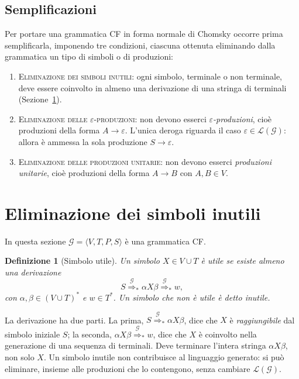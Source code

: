 \documentclass[a4paper, 11pt, oneside]{book}
\theoremstyle{formale}
\newtheorem*{definition}{Definizione}
\begin{document}
    \subsection{Semplificazioni}
    \label{sec:semplificazioni}
    Per portare una grammatica CF in forma normale di Chomsky occorre prima semplificarla,
    imponendo tre condizioni, ciascuna ottenuta eliminando dalla grammatica un tipo di
    simboli o di produzioni:
    \begin{enumerate}
        \item \textsc{Eliminazione dei simboli inutili}: ogni simbolo, terminale o non
            terminale, deve essere coinvolto in almeno una derivazione di una stringa di
            terminali (Sezione~\ref{sec:simboli-inutili}).
        \item \textsc{Eliminazione delle $\varepsilon$-produzioni}: non devono esserci
            \emph{$\varepsilon$-produzioni}, cio\`e produzioni della forma
            $A \to \varepsilon$. L'unica deroga riguarda il caso
            $\varepsilon \in \mathcal{L}(\mathcal{G})$: allora \`e ammessa la sola
            produzione $S \to \varepsilon$.
        \item \textsc{Eliminazione delle produzioni unitarie}: non devono esserci
            \emph{produzioni unitarie}, cio\`e produzioni della forma $A \to B$ con
            $A, B \in V$.
    \end{enumerate}

    \section{Eliminazione dei simboli inutili}
    \label{sec:simboli-inutili}
    In questa sezione $\mathcal{G} = \langle V, T, P, S \rangle$ \`e una grammatica CF.

    \begin{definition}[Simbolo utile]
        Un simbolo $X \in V \cup T$ \`e \emph{utile} se esiste almeno una derivazione
        \begin{equation*}
            S \overset{\mathcal{G}}{\Rightarrow}_* \alpha X \beta
            \overset{\mathcal{G}}{\Rightarrow}_* w,
        \end{equation*}
        con $\alpha, \beta \in (V \cup T)^*$ e $w \in T^*$. Un simbolo che non \`e utile
        \`e detto \emph{inutile}.
    \end{definition}
    La derivazione ha due parti. La prima, $S \overset{\mathcal{G}}{\Rightarrow}_* \alpha
    X \beta$, dice che $X$ \`e \emph{raggiungibile} dal simbolo iniziale $S$; la seconda,
    $\alpha X \beta \overset{\mathcal{G}}{\Rightarrow}_* w$, dice che $X$ \`e coinvolto
    nella generazione di una sequenza di terminali. Deve terminare l'intera stringa
    $\alpha X \beta$, non solo $X$. Un simbolo inutile non contribuisce al linguaggio
    generato: si pu\`o eliminare, insieme alle produzioni che lo contengono, senza
    cambiare $\mathcal{L}(\mathcal{G})$.
\end{document}
